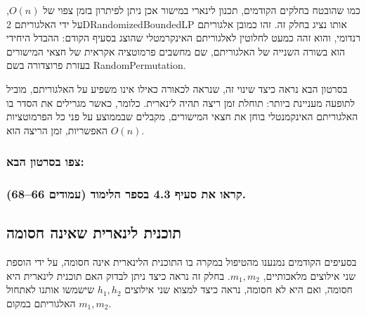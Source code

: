 \documentclass[
]{book}
\begin{document}
כמו שהובטח בחלקים הקודמים, תכנון לינארי במישור אכן ניתן לפיתרון בזמן צפוי של \(O( n )\), על ידי האלגוריתם
2DRandomizedBoundedLP אותו נציג בחלק זה. זהו כמובן אלגוריתם רנדומי, והוא זהה כמעט לחלוטין לאלגוריתם האינקרמטלי שהוצג בסעיף הקודם: ההבדל היחידי הוא בשורה השנייה של האלגוריתם, שם מחשבים פרמוטציה אקראית של חצאי המישורים בעזרת פרוצדורה בשם RandomPermutation.

בסרטון הבא נראה כיצד שינוי זה, שנראה לכאורה כאילו אינו משפיע על האלגוריתם, מוביל לתופעה מעניינת ביותר: תוחלת זמן ריצה תהיה לינארית. כלומר, כאשר מגרילים את הסדר בו האלגוריתם האינקמנטלי בוחן את חצאי המישורים, מקבלים שבממוצע על פני כל הפרמוטציות האפשריות, זמן הריצה הוא \(O( n )\).

\hypertarget{ux5e6ux5e4ux5d5-ux5d1ux5e1ux5e8ux5d8ux5d5ux5df-ux5d4ux5d1ux5d0-4}{%
\subsubsection{צפו בסרטון הבא:}\label{ux5e6ux5e4ux5d5-ux5d1ux5e1ux5e8ux5d8ux5d5ux5df-ux5d4ux5d1ux5d0-4}}

\hypertarget{ux5e7ux5e8ux5d0ux5d5-ux5d0ux5ea-ux5e1ux5e2ux5d9ux5e3-4.3-ux5d1ux5e1ux5e4ux5e8-ux5d4ux5dcux5d9ux5deux5d5ux5d3-ux5e2ux5deux5d5ux5d3ux5d9ux5dd-6668.}{%
\subsubsection*{קראו את סעיף 4.3 בספר הלימוד (עמודים 66--68).}\label{ux5e7ux5e8ux5d0ux5d5-ux5d0ux5ea-ux5e1ux5e2ux5d9ux5e3-4.3-ux5d1ux5e1ux5e4ux5e8-ux5d4ux5dcux5d9ux5deux5d5ux5d3-ux5e2ux5deux5d5ux5d3ux5d9ux5dd-6668.}}

\hypertarget{ux5eaux5d5ux5dbux5e0ux5d9ux5ea-ux5dcux5d9ux5e0ux5d0ux5e8ux5d9ux5ea-ux5e9ux5d0ux5d9ux5e0ux5d4-ux5d7ux5e1ux5d5ux5deux5d4}{%
\subsection{תוכנית לינארית שאינה חסומה}\label{ux5eaux5d5ux5dbux5e0ux5d9ux5ea-ux5dcux5d9ux5e0ux5d0ux5e8ux5d9ux5ea-ux5e9ux5d0ux5d9ux5e0ux5d4-ux5d7ux5e1ux5d5ux5deux5d4}}

בסעיפים הקודמים נמנענו מהטיפול במקרה בו התוכנית הלינארית אינה חסומה, על ידי הוספת שני אילוצים מלאכותיים, \(m_1,m_2\). בחלק זה נראה כיצד ניתן לבדוק האם תוכנית לינארית היא חסומה, ואם היא לא חסומה, נראה כיצד למצוא שני אילוצים \(h_1,h_2\) שישמשו אותנו לאתחול האלגוריתם במקום \(m_1,m_2\).
\end{document}
